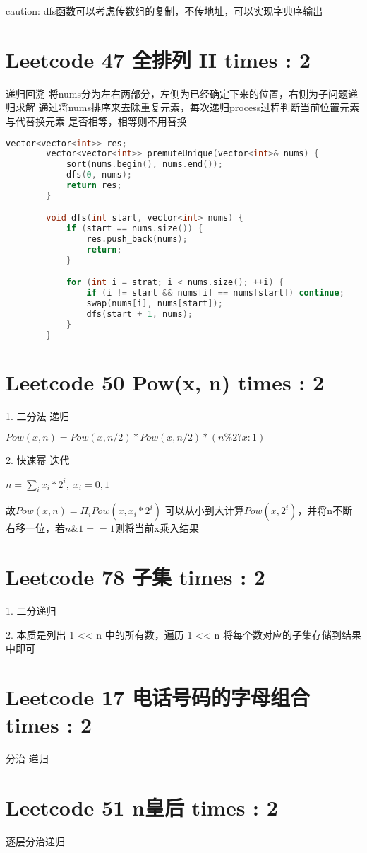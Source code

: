 \documentclass[UTF8]{ctexart}
\begin{document}
caution: dfs函数可以考虑传数组的复制，不传地址，可以实现字典序输出

\section{Leetcode 47 全排列 II times : 2}
递归回溯
将nums分为左右两部分，左侧为已经确定下来的位置，右侧为子问题递归求解
通过将nums排序来去除重复元素，每次递归process过程判断当前位置元素与代替换元素
是否相等，相等则不用替换
\begin{framed}
	\begin{lstlisting}[language=C++]
		vector<vector<int>> res;
		vector<vector<int>> premuteUnique(vector<int>& nums) {
			sort(nums.begin(), nums.end());
			dfs(0, nums);
			return res;
		}

		void dfs(int start, vector<int> nums) {
			if (start == nums.size()) {
				res.push_back(nums);
				return;
			}

			for (int i = strat; i < nums.size(); ++i) {
				if (i != start && nums[i] == nums[start]) continue;
				swap(nums[i], nums[start]);
				dfs(start + 1, nums);
			}
		}
	\end{lstlisting}
\end{framed}

\section{Leetcode 50 Pow(x, n) times : 2}
1. 二分法   递归

$Pow(x, n) = Pow(x, n/2) * Pow(x, n/2) * (n \% 2 ? x : 1)$

2. 快速幂   迭代

$n = \sum_i x_i * 2^i, \; x_i = 0, 1$

故$Pow(x, n) = \Pi_i Pow(x, x_i * 2^i)$
可以从小到大计算$Pow(x, 2^i)$，并将n不断右移一位，若$n \& 1 == 1$则将当前x乘入结果

\section{Leetcode 78 子集 times : 2}
1. 二分递归

2. 本质是列出 1 << n 中的所有数，遍历 1 << n 将每个数对应的子集存储到结果中即可

\section{Leetcode 17 电话号码的字母组合 times : 2}
分治 递归

\section{Leetcode 51 n皇后 times : 2}
逐层分治递归
\end{document}
